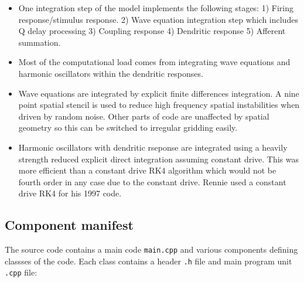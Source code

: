 \documentclass[12pt,a4paper]{article}
\newcommand{\type}[1]{ {\small\small\tt #1} }
\begin{document}
\begin{itemize}
\item One integration step of the model implements the following stages: 1) Firing response/\linebreak stimulus response. 2) Wave equation integration step which includes Q delay processing 3) Coupling response 4) Dendritic response 5) Afferent summation.
\item Most of the computational load comes from integrating wave equations and harmonic oscillators within the dendritic responses.
\item Wave equations are integrated by explicit finite differences integration. A nine point spatial stencil is used to reduce high frequency spatial instabilities when driven by random noise. Other parts of code are unaffected by spatial geometry so this can be switched to irregular gridding easily.
\item Harmonic oscillators with dendritic rseponse are integrated using a heavily strength reduced explicit direct integration assuming constant drive. This was more efficient than a constant drive RK4 algorithm which would not be fourth order in any case due to the constant drive. Rennie used a constant drive RK4 for his 1997 code.
\end{itemize}

\subsection{Component manifest}

The source code contains a main code \type{main.cpp} and various components defining classses of the code. Each class contains a header \type{.h} file and main program unit \type{.cpp} file:
\end{document}
